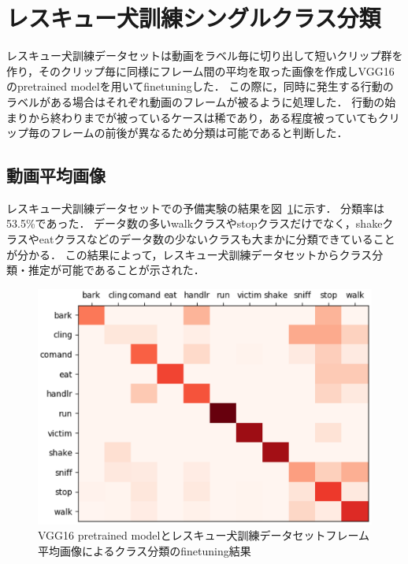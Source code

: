 \section{レスキュー犬訓練シングルクラス分類}
レスキュー犬訓練データセットは動画をラベル毎に切り出して短いクリップ群を作り，そのクリップ毎に同様にフレーム間の平均を取った画像を作成しVGG16のpretrained modelを用いてfinetuningした．
この際に，同時に発生する行動のラベルがある場合はそれぞれ動画のフレームが被るように処理した．
行動の始まりから終わりまでが被っているケースは稀であり，ある程度被っていてもクリップ毎のフレームの前後が異なるため分類は可能であると判断した．
\subsection{動画平均画像}
レスキュー犬訓練データセットでの予備実験の結果を図~\ref{sub_resque_res}に示す．
分類率は53.5\%であった．
データ数の多いwalkクラスやstopクラスだけでなく，shakeクラスやeatクラスなどのデータ数の少ないクラスも大まかに分類できていることが分かる．
この結果によって，レスキュー犬訓練データセットからクラス分類・推定が可能であることが示された．

\begin{figure}[H]
  \begin{center}
    \includegraphics[scale=0.7]{./Figures/resque_mean_result.eps}
    \caption{VGG16 pretrained modelとレスキュー犬訓練データセットフレーム平均画像によるクラス分類のfinetuning結果}
    \label{sub_resque_res}
  \end{center}
\end{figure}

